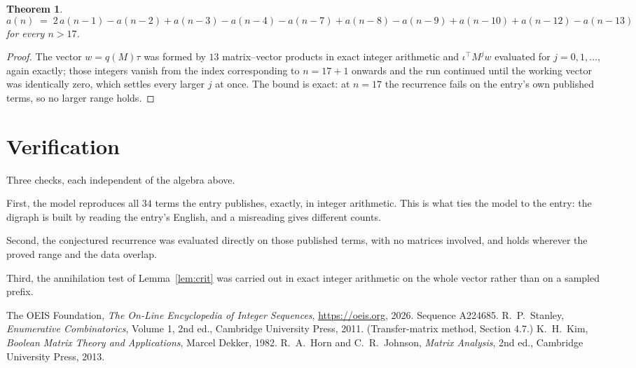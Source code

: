 \documentclass[11pt,a4paper]{article}
\theoremstyle{plain}
\newtheorem{theorem}{Theorem}
\theoremstyle{definition}
\begin{document}
\begin{theorem}
\[
a(n)\;=\;2\,a(n-1) - a(n-2) + a(n-3) - a(n-4) - a(n-7) + a(n-8) - a(n-9) + a(n-10) + a(n-12) - a(n-13)
\]
for every $n>17$.
\end{theorem}

\begin{proof}
The vector $w=q(M)\tau$ was formed by $13$ matrix--vector products in exact integer
arithmetic and $\iota^{\!\top}M^{j}w$ evaluated for $j=0,1,\dots$, again exactly; those
integers vanish from the index corresponding to $n=17+1$ onwards and the run continued
until the working vector was identically zero, which settles every larger $j$ at once. The bound is exact: at $n=17$ the recurrence fails on the entry's own published terms, so no larger range holds.
\end{proof}

\section{Verification}

Three checks, each independent of the algebra above.

First, the model reproduces all $34$ terms the entry publishes, exactly, in integer
arithmetic. This is what ties the model to the entry: the digraph is built by reading the
entry's English, and a misreading gives different counts.

Second, the conjectured recurrence was evaluated directly on those published terms, with no
matrices involved, and holds wherever the proved range and the data overlap.

Third, the annihilation test of Lemma~\ref{lem:crit} was carried out in exact integer
arithmetic on the whole vector rather than on a sampled prefix.

\begin{thebibliography}{9}
 The OEIS Foundation, \emph{The On-Line Encyclopedia of Integer
Sequences}, \url{https://oeis.org}, 2026. Sequence A224685.
 R.~P.~Stanley, \emph{Enumerative Combinatorics}, Volume 1, 2nd ed.,
Cambridge University Press, 2011. (Transfer-matrix method, Section 4.7.)
 K.~H.~Kim, \emph{Boolean Matrix Theory and Applications}, Marcel Dekker,
1982.
 R.~A.~Horn and C.~R.~Johnson, \emph{Matrix Analysis}, 2nd ed., Cambridge
University Press, 2013.
\end{thebibliography}
\end{document}
